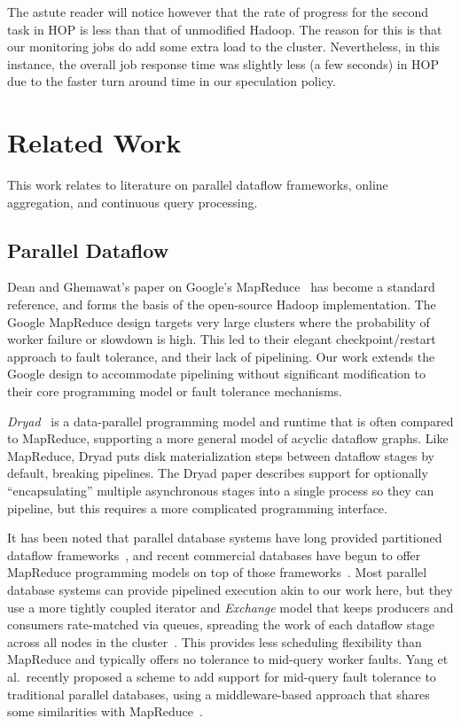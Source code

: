 The astute reader will notice however that the rate of progress for the second
task in HOP is less than that of unmodified Hadoop.  The reason for this is
that our monitoring jobs do add some extra load to the cluster.  Nevertheless,
in this instance, the overall job response time was slightly less (a few
seconds) in HOP due to the faster turn around time in our speculation policy.


\section{Related Work}
\label{ch:hop:sec:relwork}

This work relates to literature on parallel dataflow frameworks, online
aggregation, and continuous query processing.

\subsection{Parallel Dataflow}

Dean and Ghemawat's paper on Google's MapReduce~\cite{mapreduce-osdi} has
become a standard reference, and forms the basis of the open-source Hadoop
implementation.  The Google MapReduce design targets very large clusters where
the probability of worker failure or slowdown is high.  This led to their
elegant checkpoint/restart approach to fault tolerance, and their lack of
pipelining.  Our work extends the Google design to accommodate pipelining
without significant modification to their core programming model or fault
tolerance mechanisms.

{\em Dryad}~\cite{dryad07} is a data-parallel programming model and runtime
that is often compared to MapReduce, supporting a more general model of acyclic
dataflow graphs.  Like MapReduce, Dryad puts disk materialization steps between
dataflow stages by default, breaking pipelines.  The Dryad paper describes
support for optionally ``encapsulating'' multiple asynchronous stages into a
single process so they can pipeline, but this requires a more complicated
programming interface.

It has been noted that parallel database systems have long provided partitioned
dataflow frameworks~\cite{pavlo09}, and recent commercial databases have begun
to offer MapReduce programming models on top of those
frameworks~\cite{aster,greenplum}.  Most parallel database systems can provide
pipelined execution akin to our work here, but they use a more tightly coupled
iterator and {\em Exchange} model that keeps producers and consumers
rate-matched via queues, spreading the work of each dataflow stage across all
nodes in the cluster~\cite{exchange}.  This provides less scheduling
flexibility than MapReduce and typically offers no tolerance to mid-query
worker faults.  Yang et al.\ recently proposed a scheme to add support for
mid-query fault tolerance to traditional parallel databases, using a
middleware-based approach that shares some similarities with
MapReduce~\cite{osprey-icde}.

